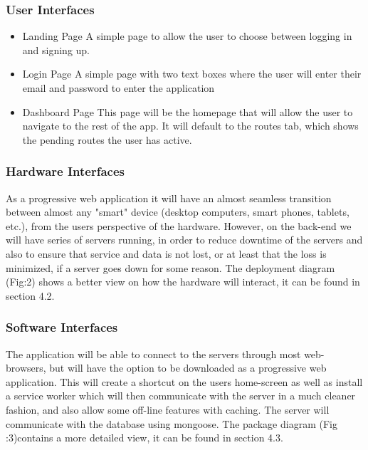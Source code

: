 \documentclass[a4paper]{article}
\begin{document}
    \subsubsection{User Interfaces}
    \begin{itemize}
    \item Landing Page \newline
    A simple page to allow the user to choose between logging in and signing up. 
    
    \item Login Page \newline
    A simple page with two text boxes where the user will enter their email and password to enter the application
    
    \item Dashboard Page \newline
    This page will be the homepage that will allow the user to navigate to the rest of the app. It will default to the routes tab, which shows the pending routes the user has active.
    
   
    \end{itemize}
    \subsubsection{Hardware Interfaces}
    As a progressive web application it will have an almost seamless transition between almost any "smart" device (desktop computers, smart phones, tablets, etc.), from the users perspective of the hardware.
   \newline
   However, on the back-end we will have series of servers running, in order to reduce downtime of the servers and also to ensure that service and data is not lost, or at least that the loss is minimized, if a server goes down for some reason.  The deployment diagram (Fig:2) shows a better view on how the hardware will interact, it can be found in section 4.2.

    \subsubsection{Software Interfaces}
    The application will be able to connect to the servers through most web-browsers, but will have the option to be downloaded as a progressive web application.  This will create a shortcut on the users home-screen as well as install a service worker which will then communicate with the server in a much cleaner fashion, and also allow some off-line features with caching.  \newline
    The server will communicate with the database using mongoose.  The package diagram (Fig :3)contains a more detailed view, it can be found in section 4.3.
    
\end{document}
